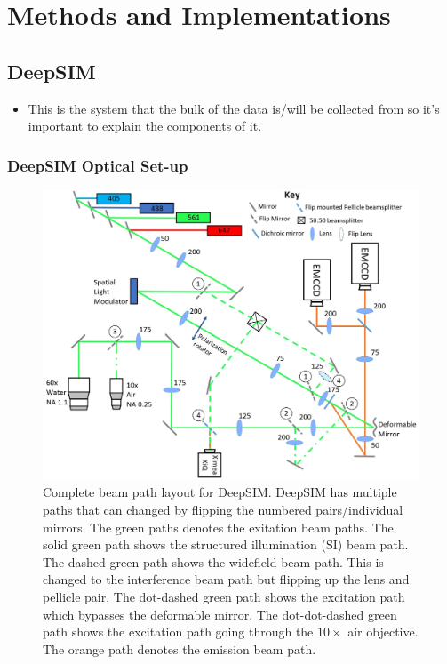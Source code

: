 \chapter{Methods and Implementations}

\section{DeepSIM}
\label{sec:DeepSIM}

\begin{itemize}
	\item This is the system that the bulk of the data is/will be collected from so it's important to explain the components of it.
\end{itemize}

	\subsection{DeepSIM Optical Set-up}
	\label{subsec:DeepSIM_optics}
	
	\begin{figure}[h]
		\centering
		\includegraphics[width=\textwidth]{images/DeepSIM_complete_beam_paths.jpg}
		\caption{Complete beam path layout for DeepSIM. DeepSIM has multiple paths that can changed by flipping the numbered pairs/individual mirrors. The green paths denotes the exitation beam paths. The solid green path shows the structured illumination (SI) beam path. The dashed green path shows the widefield beam path. This is changed to the interference beam path but flipping up the lens and pellicle pair. The dot-dashed green path shows the excitation path which bypasses the deformable mirror. The dot-dot-dashed green path shows the excitation path going through the $10\times$ air objective. The orange path denotes the emission beam path.}
		\label{fig:DeepSIM_complete_beam_paths}
	\end{figure}
	
